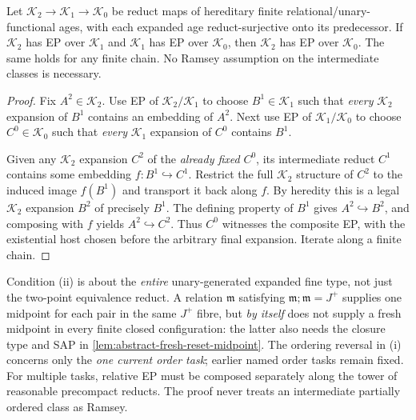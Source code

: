 \begin{lemma}
\label{lem:foundational-relative-EP-composition}
Let $\mathcal K_2\to\mathcal K_1\to
\mathcal K_0$ be reduct maps of hereditary
finite relational/unary-functional ages, with
each expanded age reduct-surjective onto its
predecessor. If $\mathcal K_2$ has EP over
$\mathcal K_1$ and $\mathcal K_1$ has EP over
$\mathcal K_0$, then $\mathcal K_2$ has EP
over $\mathcal K_0$. The same holds for
any finite chain. No Ramsey assumption on
the intermediate classes is necessary.
\end{lemma}
\begin{proof}
Fix $A^2\in\mathcal K_2$. Use EP of
$\mathcal K_2/\mathcal K_1$ to choose
$B^1\in\mathcal K_1$ such that
\emph{every} $\mathcal K_2$ expansion
of $B^1$ contains an embedding of
$A^2$. Next use EP of
$\mathcal K_1/\mathcal K_0$ to choose
$C^0\in\mathcal K_0$ such that
\emph{every} $\mathcal K_1$ expansion
of $C^0$ contains $B^1$.

Given any $\mathcal K_2$ expansion
$C^2$ of the \emph{already fixed}
$C^0$, its intermediate reduct
$C^1$ contains some embedding
$f:B^1\hookrightarrow C^1$.
Restrict the full $\mathcal K_2$
structure of $C^2$ to the induced
image $f(B^1)$ and transport it
back along $f$. By heredity this
is a legal $\mathcal K_2$ expansion
$B^2$ of precisely $B^1$.
The defining property of $B^1$
gives $A^2\hookrightarrow B^2$,
and composing with $f$ yields
$A^2\hookrightarrow C^2$.
Thus $C^0$ witnesses the composite
EP, with the existential host
chosen before the arbitrary final
expansion. Iterate along a finite
chain.
\end{proof}

\begin{remark}
\label{rem:abstract-reset-EP-scope}
Condition (ii) is about the \emph{entire}
unary-generated expanded fine type, not just
the two-point equivalence reduct.
A relation $\mathfrak m$ satisfying
$\mathfrak m;\mathfrak m=J^+$ supplies
one midpoint for each pair in the same
$J^+$ fibre, but \emph{by itself} does
not supply a fresh midpoint in every
finite closed configuration: the latter
also needs the closure type and SAP in
\cref{lem:abstract-fresh-reset-midpoint}.
The ordering reversal in (i) concerns
only the \emph{one current order task};
earlier named order tasks remain fixed.
For multiple tasks, relative EP must
be composed separately along the tower
of reasonable precompact reducts.
The proof never treats an intermediate
partially ordered class as Ramsey.
\end{remark}
